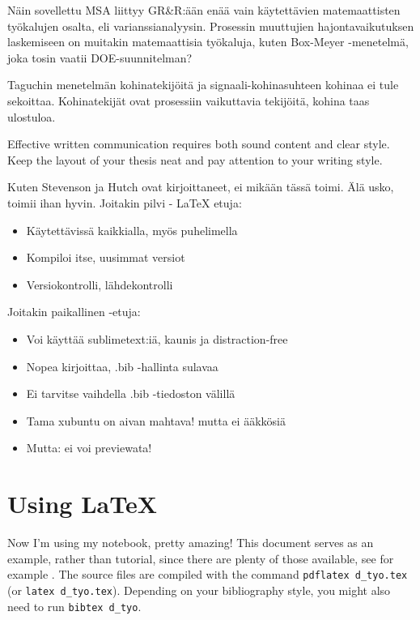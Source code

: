 \documentclass[12pt,a4paper,finnish]{tutthesis}
\begin{document}
Näin sovellettu MSA liittyy GR\&R:ään enää vain käytettävien matemaattisten
työkalujen osalta, eli varianssianalyysin. Prosessin muuttujien
hajontavaikutuksen laskemiseen on muitakin matemaattisia työkaluja,
kuten Box-Meyer -menetelmä, joka tosin vaatii DOE-suunnitelman?


Taguchin menetelmän kohinatekijöitä ja signaali-kohinasuhteen kohinaa
ei tule sekoittaa. Kohinatekijät ovat prosessiin vaikuttavia tekijöitä,
kohina taas ulostuloa.


Effective written communication requires both sound content and clear
style. Keep the layout of your thesis neat and pay attention to your
writing style.

Kuten Stevenson ja Hutch \parencite{rubberwheel} ovat kirjoittaneet,
ei mikään tässä toimi. Älä usko, toimii ihan hyvin. Joitakin pilvi - \LaTeX
etuja:
\begin{itemize}
\item Käytettävissä kaikkialla, myös puhelimella
\item Kompiloi itse, uusimmat versiot
\item Versiokontrolli, lähdekontrolli
\end{itemize}

Joitakin paikallinen \LaTeXe -etuja:
\begin{itemize}
\item Voi käyttää sublimetext:iä, kaunis ja distraction-free
\item Nopea kirjoittaa, .bib -hallinta sulavaa
\item Ei tarvitse vaihdella .bib -tiedoston välillä
\item Tama xubuntu on aivan mahtava! mutta ei \"a\"akk\"osi\"a
\item Mutta: ei voi previewata!
\end{itemize}
\section{Using LaTeX}

Now I'm using my notebook, pretty amazing!
This document serves as an example, rather than tutorial, since there
are plenty of those available, see for example 
\cite{mittelbach04,oetiker14, latex13}. The source files are compiled
with the command \texttt{pdflatex d\_tyo.tex} (or \texttt{latex
  d\_tyo.tex}). Depending on your bibliography style, you might also
need to run \texttt{bibtex d\_tyo}.
\end{document}
